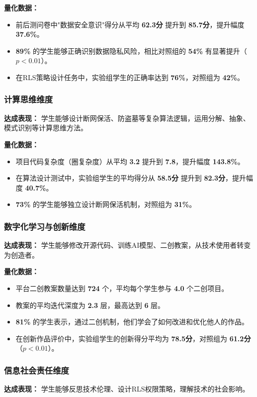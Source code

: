 \documentclass[12pt,a4paper,fontset=fandol]{ctexart}
\begin{document}
\textbf{量化数据：}
\begin{itemize}
    \item 前后测问卷中"数据安全意识"得分从平均 \textbf{62.3分} 提升到 \textbf{85.7分}，提升幅度 \textbf{37.6\%}。
    \item \textbf{89\%} 的学生能够正确识别数据隐私风险，相比对照组的 \textbf{54\%} 有显著提升（$p < 0.01$）。
    \item 在RLS策略设计任务中，实验组学生的正确率达到 \textbf{76\%}，对照组为 \textbf{42\%}。
\end{itemize}

\subsubsection{计算思维维度}
\textbf{达成表现：} 学生能够设计断网保活、防盗墓等复杂算法逻辑，运用分解、抽象、模式识别等计算思维方法。

\textbf{量化数据：}
\begin{itemize}
    \item 项目代码复杂度（圈复杂度）从平均 \textbf{3.2} 提升到 \textbf{7.8}，提升幅度 \textbf{143.8\%}。
    \item 在算法设计测试中，实验组学生的平均得分从 \textbf{58.5分} 提升到 \textbf{82.3分}，提升幅度 \textbf{40.7\%}。
    \item \textbf{73\%} 的学生能够独立设计断网保活机制，对照组为 \textbf{31\%}。
\end{itemize}

\subsubsection{数字化学习与创新维度}
\textbf{达成表现：} 学生能够修改开源代码、训练AI模型、二创教案，从技术使用者转变为创造者。

\textbf{量化数据：}
\begin{itemize}
    \item 平台二创教案数量达到 \textbf{724} 个，平均每个学生参与 \textbf{4.0} 个二创项目。
    \item 教案的平均迭代深度为 \textbf{2.3} 层，最高达到 \textbf{6} 层。
    \item \textbf{81\%} 的学生表示，通过二创机制，他们学会了如何改进和优化他人的作品。
    \item 在创新作品评价中，实验组学生的创新得分平均为 \textbf{78.5分}，对照组为 \textbf{61.2分}（$p < 0.01$）。
\end{itemize}

\subsubsection{信息社会责任维度}
\textbf{达成表现：} 学生能够反思技术伦理、设计RLS权限策略，理解技术的社会影响。
\end{document}
